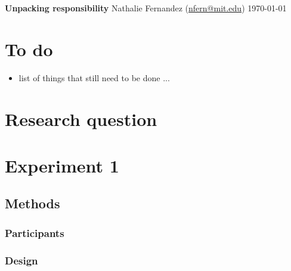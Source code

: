 \documentclass[11pt]{article}
\begin{document}
\begin{center} 
{\LARGE \textbf{Unpacking responsibility}}
\linebreak
\linebreak
{\large Nathalie Fernandez (\href{mailto:nfern@mit.edu}{nfern@mit.edu})}
\linebreak
\today
\end{center} 

\tableofcontents 
\clearpage 

\section{To do}
\label{sec:to_do}

\begin{itemize}
	\item list of things that still need to be done ... 
\end{itemize}

\clearpage 
\section{Research question}
\label{sec:research_question}

\section{Experiment 1}
\label{sec:experiment_1}

\subsection{Methods}
\label{sub:methods}

\subsubsection{Participants}
\label{ssub:participants}

\subsubsection{Design}
\label{ssub:design}
\end{document}
